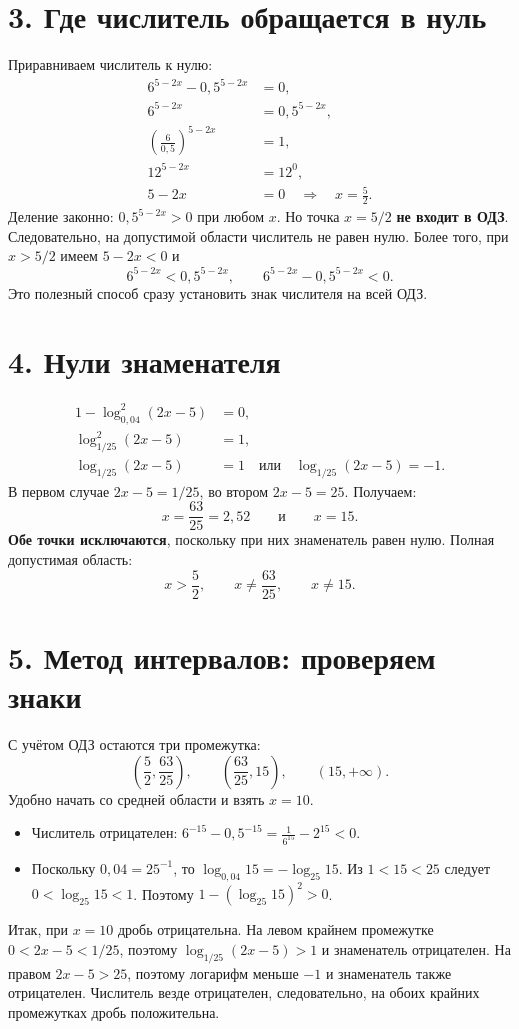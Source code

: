 \documentclass[a4paper,12pt]{article}
\newcommand{\lead}[1]{\textcolor{darkaccent}{\textbf{#1}}}
\begin{document}
\section*{3. Где числитель обращается в нуль}
Приравниваем числитель к нулю:
\begin{align*}
6^{5-2x}-0{,}5^{5-2x}&=0,\\
6^{5-2x}&=0{,}5^{5-2x},\\
\left(\frac6{0{,}5}\right)^{5-2x}&=1,\\
12^{5-2x}&=12^0,\\
5-2x&=0\quad\Longrightarrow\quad x=\frac52.
\end{align*}
Деление законно: $0{,}5^{5-2x}>0$ при любом $x$. Но точка $x=5/2$ \lead{не входит в ОДЗ}. Следовательно, на допустимой области числитель не равен нулю. Более того, при $x>5/2$ имеем $5-2x<0$ и
\[
6^{5-2x}<0{,}5^{5-2x},\qquad
\boxed{6^{5-2x}-0{,}5^{5-2x}<0}.
\]
Это полезный способ сразу установить знак числителя на всей ОДЗ.

\section*{4. Нули знаменателя}
\begin{align*}
1-\log_{0{,}04}^{2}(2x-5)&=0,\\
\log_{1/25}^{2}(2x-5)&=1,\\
\log_{1/25}(2x-5)&=1\quad\text{или}\quad
\log_{1/25}(2x-5)=-1.
\end{align*}
В первом случае $2x-5=1/25$, во втором $2x-5=25$. Получаем:
\[
\boxed{x=\frac{63}{25}=2{,}52}\qquad\text{и}\qquad\boxed{x=15}.
\]
\lead{Обе точки исключаются}, поскольку при них знаменатель равен нулю. Полная допустимая область:
\[
x>\frac52,\qquad x\ne\frac{63}{25},\qquad x\ne15.
\]

\section*{5. Метод интервалов: проверяем знаки}
С учётом ОДЗ остаются три промежутка:
\[
\left(\frac52,\frac{63}{25}\right),\qquad
\left(\frac{63}{25},15\right),\qquad(15,+\infty).
\]
Удобно начать со средней области и взять $x=10$.
\begin{itemize}
\item Числитель отрицателен: $6^{-15}-0{,}5^{-15}=\frac1{6^{15}}-2^{15}<0$.
\item Поскольку $0{,}04=25^{-1}$, то $\log_{0{,}04}15=-\log_{25}15$.
      Из $1<15<25$ следует $0<\log_{25}15<1$.
      Поэтому $1-(\log_{25}15)^2>0$.
\end{itemize}
Итак, при $x=10$ дробь отрицательна. На левом крайнем промежутке $0<2x-5<1/25$, поэтому $\log_{1/25}(2x-5)>1$ и знаменатель отрицателен. На правом $2x-5>25$, поэтому логарифм меньше $-1$ и знаменатель также отрицателен. Числитель везде отрицателен, следовательно, на обоих крайних промежутках дробь положительна.
\end{document}
